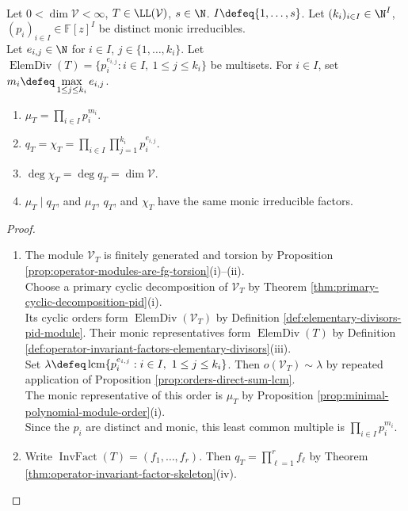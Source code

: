 \begin{theorem} \label{thm:minimal-characteristic-elementary-divisor-relations} \\
Let $0<\dim\mathcal{V}<\infty$, $T\in\LL(\mathcal{V})$, $s\in\N$. $I\defeq\{1,\ldots,s\}$. Let $(k_i)_{i\in I}\in\N^I$, $(p_i)_{i\in I}\in\mathbb{F}[z]^I$ be distinct monic irreducibles.\\
Let $e_{i,j}\in\N$ for $i\in I$, $j\in\{1,\ldots,k_i\}$. Let $\operatorname{ElemDiv}(T)=\{p_i^{e_{i,j}}:i\in I,\ 1\leq j\leq k_i\}$ be multisets. For $i\in I$, set $m_i\defeq\max\limits_{1\leq j\leq k_i}e_{i,j}$.
\begin{enumerate}[label=(\roman*)]
\setlength{\itemsep}{0pt}
\item $\mu_T=\prod\limits_{i\in I}p_i^{m_i}$.
\item $q_T=\chi_T=\prod\limits_{i\in I}\prod\limits_{j=1}^{k_i}p_i^{e_{i,j}}$.
\item $\deg\chi_T=\deg q_T=\dim\mathcal{V}$.
\item $\mu_T\mid q_T$, and $\mu_T$, $q_T$, and $\chi_T$ have the same monic irreducible factors.
\end{enumerate}
\begin{proof}
\begin{enumerate}[label=(\roman*)]
\setlength{\itemsep}{0pt}
\item The module $\mathcal{V}_T$ is finitely generated and torsion by Proposition \ref{prop:operator-modules-are-fg-torsion}(i)--(ii).\\
Choose a primary cyclic decomposition of $\mathcal{V}_T$ by Theorem \ref{thm:primary-cyclic-decomposition-pid}(i).\\
Its cyclic orders form $\operatorname{ElemDiv}(\mathcal{V}_T)$ by Definition \ref{def:elementary-divisors-pid-module}. Their monic representatives form $\operatorname{ElemDiv}(T)$ by Definition \ref{def:operator-invariant-factors-elementary-divisors}(iii).\\
Set $\lambda\defeq\operatorname{lcm}\{p_i^{e_{i,j}}:i\in I,\ 1\leq j\leq k_i\}$. Then $o(\mathcal{V}_T)\sim\lambda$ by repeated application of Proposition \ref{prop:orders-direct-sum-lcm}.\\
The monic representative of this order is $\mu_T$ by Proposition \ref{prop:minimal-polynomial-module-order}(i).\\
Since the $p_i$ are distinct and monic, this least common multiple is $\prod\limits_{i\in I}p_i^{m_i}$.
\item Write $\operatorname{InvFact}(T)=(f_1,\ldots,f_r)$. Then $q_T=\prod\limits_{\ell=1}^rf_\ell$ by Theorem \ref{thm:operator-invariant-factor-skeleton}(iv).\\

\end{enumerate}
\end{proof}
\end{theorem}
